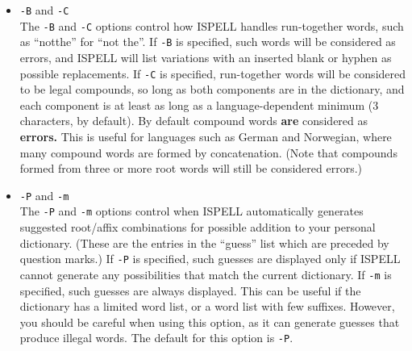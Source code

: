 \documentclass[twoside,11pt]{article}
\begin{document}
\begin{itemize}
\begin{verbatim}
   \chapter {This is a Ckapter} \cite{SCH86}
\end{verbatim}

ISPELL will find \verb+Ckapter+ but not \verb+SCH+\@.
The \verb+-t+ option does not recognize the \TeX\ comment character \verb+%+,
so comments are also spell-checked.
It also assumes correct \LaTeX\ syntax.
Arguments to infrequently used commands and some optional arguments are
sometimes checked unnecessarily.

References for the \verb+tib+ bibliography system, that is, text between a
``[.'' or ``$<$.'' and ``.]'' or ``.$>$'' will always be ignored in \TeX /\LaTeX\
mode.

\item {\Large\tt -B} and {\Large\tt -C} \\
The \verb+-B+ and \verb+-C+ options control how ISPELL handles run-together
words, such as ``notthe'' for ``not the''\@.
If \verb+-B+ is specified, such words will be considered as errors, and
ISPELL will list variations with an inserted blank or hyphen as possible
replacements.
If \verb+-C+ is specified, run-together words will be considered to be legal
compounds, so long as both components are in the dictionary, and each component
is at least as long as a language-dependent minimum (3 characters, by default).
By default compound words {\bf are} considered as {\bf errors.}
This is useful for languages such as German and Norwegian, where many compound
words are formed by concatenation.
(Note that compounds formed from three or more root words will still be
considered errors.)

\item {\Large\tt -P} and {\Large\tt -m} \\
The \verb+-P+ and \verb+-m+ options control when ISPELL automatically generates
suggested root/affix combinations for possible addition to your personal
dictionary.
(These are the entries in the ``guess'' list which are preceded by question
marks.)
If \verb+-P+ is specified, such guesses are displayed only if ISPELL
cannot generate any possibilities that match the current dictionary.
If \verb+-m+ is specified, such guesses are always displayed.
This can be useful if the dictionary has a limited word list, or a word list
with few suffixes.
However, you should be careful when using this option, as it can generate
guesses that produce illegal words.
The default for this option is \verb+-P+\@.


\end{itemize}
\end{document}
